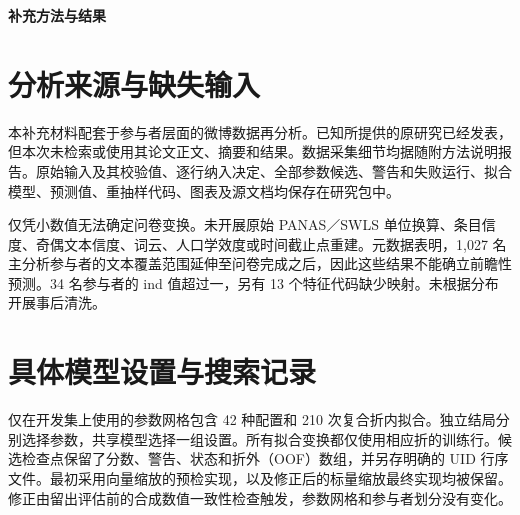 \documentclass[11pt,letterpaper]{article}
\begin{document}
\begin{center}\fontsize{16}{20}\selectfont\bfseries 补充方法与结果\end{center}
\section{分析来源与缺失输入}\label{ux5206ux6790ux6765ux6e90ux4e0eux7f3aux5931ux8f93ux5165}

本补充材料配套于参与者层面的微博数据再分析。已知所提供的原研究已经发表，但本次未检索或使用其论文正文、摘要和结果。数据采集细节均据随附方法说明报告。原始输入及其校验值、逐行纳入决定、全部参数候选、警告和失败运行、拟合模型、预测值、重抽样代码、图表及源文档均保存在研究包中。

仅凭小数值无法确定问卷变换。未开展原始 PANAS／SWLS 单位换算、条目信度、奇偶文本信度、词云、人口学效度或时间截止点重建。元数据表明，1,027 名主分析参与者的文本覆盖范围延伸至问卷完成之后，因此这些结果不能确立前瞻性预测。34 名参与者的 ind 值超过一，另有 13 个特征代码缺少映射。未根据分布开展事后清洗。

\section{具体模型设置与搜索记录}\label{ux5177ux4f53ux6a21ux578bux8bbeux7f6eux4e0eux641cux7d22ux8bb0ux5f55}

仅在开发集上使用的参数网格包含 42 种配置和 210 次复合折内拟合。独立结局分别选择参数，共享模型选择一组设置。所有拟合变换都仅使用相应折的训练行。候选检查点保留了分数、警告、状态和折外（OOF）数组，并另存明确的 UID 行序文件。最初采用向量缩放的预检实现，以及修正后的标量缩放最终实现均被保留。修正由留出评估前的合成数值一致性检查触发，参数网格和参与者划分没有变化。

\begingroup\singlespacing\fontsize{10}{12}\selectfont\setlength{\parindent}{0pt}
\end{document}
